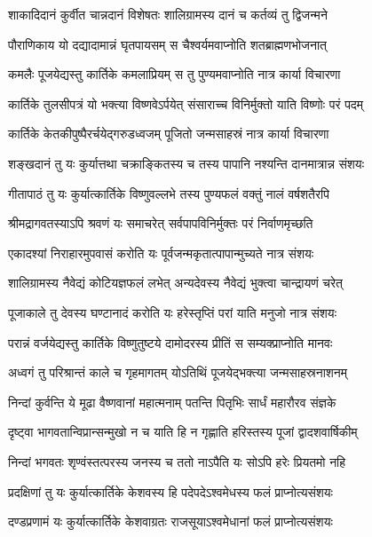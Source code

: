 \twolineshloka
{शाकादिदानं कुर्वीत चान्नदानं विशेषतः}
{शालिग्रामस्य दानं च कर्तव्यं तु द्विजन्मने} %

\twolineshloka
{पौराणिकाय यो दद्यादामान्नं घृतपायसम्}
{स चैश्वर्यमवाप्नोति शतब्राह्मणभोजनात्} %

\twolineshloka
{कमलैः पूजयेद्यस्तु कार्तिके कमलाप्रियम्}
{स तु पुण्यमवाप्नोति नात्र कार्या विचारणा} %

\twolineshloka
{कार्तिके तुलसीपत्रं यो भक्त्या विष्णवेऽर्पयेत्}
{संसाराच्च विनिर्मुक्तो याति विष्णोः परं पदम्} %

\twolineshloka
{कार्तिके केतकीपुष्पैरर्चयेद्गरुडध्वजम्}
{पूजितो जन्मसाहस्रं नात्र कार्या विचारणा} %

\twolineshloka
{शङ्खदानं तु यः कुर्यात्तथा चक्राङ्कितस्य च}
{तस्य पापानि नश्यन्ति दानमात्रान्न संशयः} %

\twolineshloka
{गीतापाठं तु यः कुर्यात्कार्तिके विष्णुवल्लभे}
{तस्य पुण्यफलं वक्तुं नालं वर्षशतैरपि} %

\twolineshloka
{श्रीमद्रागवतस्याऽपि श्रवणं यः समाचरेत्}
{सर्वपापविनिर्मुक्तः परं निर्वाणमृच्छति} %

\twolineshloka
{एकादश्यां निराहारमुपवासं करोति यः}
{पूर्वजन्मकृतात्पापान्मुच्यते नात्र संशयः} %

\twolineshloka
{शालिग्रामस्य नैवेद्यं कोटियज्ञफलं लभेत्}
{अन्यदेवस्य नैवेद्यं भुक्त्वा चान्द्रायणं चरेत्} %

\twolineshloka
{पूजाकाले तु देवस्य घण्टानादं करोति यः}
{हरेस्तृप्तिं परां याति मनुजो नात्र संशयः} %

\twolineshloka
{परान्नं वर्जयेद्यस्तु कार्तिके विष्णुतुष्टये}
{दामोदरस्य प्रीतिं स सम्यक्प्राप्नोति मानवः} %

\twolineshloka
{अध्वगं तु परिश्रान्तं काले च गृहमागतम्}
{योऽतिथिं पूजयेद्भक्त्या जन्मसाहस्रनाशनम्} %

\twolineshloka
{निन्दां कुर्वन्ति ये मूढा वैष्णवानां महात्मनाम्}
{पतन्ति पितृभिः सार्धं महारौरव संज्ञके} %

\twolineshloka
{दृष्ट्वा भागवतान्विप्रान्सन्मुखो न च याति हि}
{न गृह्णाति हरिस्तस्य पूजां द्वादशवार्षिकीम्} %

\twolineshloka
{निन्दां भगवतः शृण्वंस्तत्परस्य जनस्य च}
{ततो नाऽपैति यः सोऽपि हरेः प्रियतमो नहि} %

\twolineshloka
{प्रदक्षिणां तु यः कुर्यात्कार्तिके केशवस्य हि}
{पदेपदेऽश्वमेधस्य फलं प्राप्नोत्यसंशयः} %

\twolineshloka
{दण्डप्रणामं यः कुर्यात्कार्तिके केशवाग्रतः}
{राजसूयाऽश्वमेधानां फलं प्राप्नोत्यसंशयः} %

